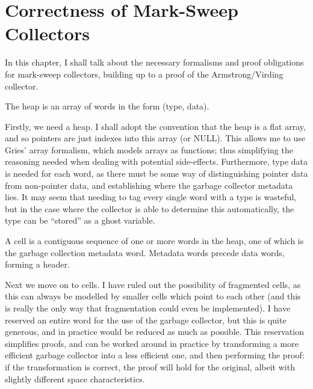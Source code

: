 \chapter{Correctness of Mark-Sweep Collectors}

In this chapter, I shall talk about the necessary formalisms and proof
obligations for \gls{mark-sweep} \glspl{collector}, building up to a
proof of the Armstrong/Virding\cite{Armstrong95} \gls{collector}.

\begin{definition}[Heap]
  The heap is an array of words in the form (type, data).
\end{definition}

Firstly, we need a \gls{heap}. I shall adopt the convention that the
\gls{heap} is a flat array, and so \glspl{pointer} are just indexes
into this array (or NULL). This allows me to use Gries' array
formalism\cite{Gries87}, which models arrays as functions; thus
simplifying the reasoning needed when dealing with potential
side-effects. Furthermore, type data is needed for each word, as there
must be some way of distinguishing \gls{pointer} data from non-pointer
data, and establishing where the \gls{garbage collector} metadata
lies. It may seem that needing to tag every single word with a type is
wasteful, but in the case where the \gls{collector} is able to
determine this automatically, the type can be ``stored'' as a ghost
variable.

\begin{definition}[Cell]
  A cell is a contiguous sequence of one or more words in the heap,
  one of which is the garbage collection metadata word. Metadata words
  precede data words, forming a header.
\end{definition}

Next we move on to \glspl{cell}. I have ruled out the possibility of
fragmented \glspl{cell}, as this can always be modelled by smaller
\glspl{cell} which point to each other (and this is really the only
way that fragmentation could even be implemented). I have reserved an
entire word for the use of the \gls{garbage collector}, but this is
quite generous, and in practice would be reduced as much as
possible. This reservation simplifies proofs, and can be worked around
in practice by transforming a more efficient \gls{garbage collector}
into a less efficient one, and then performing the proof: if the
transformation is correct, the proof will hold for the original,
albeit with slightly different space characteristics.

